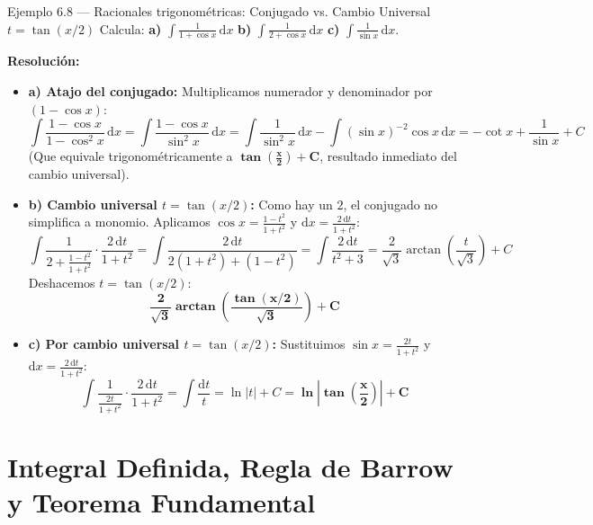 \documentclass[10pt,a4paper]{article}
\newcommand{\minspace}[1]{\par\ifdim\dimexpr\pagegoal-\pagetotal\relax<#1\newpage\fi}
\begin{document}
\begin{ejemploboxlong}{Ejemplo 6.8 --- Racionales trigonométricas: Conjugado vs. Cambio Universal $t = \tan(x/2)$}
Calcula: \quad \textbf{a)} $\displaystyle \int \frac{1}{1 + \cos x}\,\mathrm{d}x$ \qquad \textbf{b)} $\displaystyle \int \frac{1}{2 + \cos x}\,\mathrm{d}x$ \qquad \textbf{c)} $\displaystyle \int \frac{1}{\sin x}\,\mathrm{d}x$.
\par\textbf{Resolución:}
\begin{itemize}\itemsep 4pt
  \item \textbf{a) Atajo del conjugado:} Multiplicamos numerador y denominador por $(1 - \cos x)$:
  $$\int \frac{1 - \cos x}{1 - \cos^2 x}\,\mathrm{d}x = \int \frac{1 - \cos x}{\sin^2 x}\,\mathrm{d}x = \int \frac{1}{\sin^2 x}\,\mathrm{d}x - \int (\sin x)^{-2}\cos x\,\mathrm{d}x = -\cot x + \frac{1}{\sin x} + C$$
  (Que equivale trigonométricamente a $\displaystyle \mathbf{\tan\!\left(\frac{x}{2}\right) + C}$, resultado inmediato del cambio universal).

  \item \textbf{b) Cambio universal $t = \tan(x/2)$:} Como hay un $2$, el conjugado no simplifica a monomio. Aplicamos $\cos x = \frac{1-t^2}{1+t^2}$ y $\mathrm{d}x = \frac{2\,\mathrm{d}t}{1+t^2}$:
  $$\int \frac{1}{2 + \frac{1 - t^2}{1 + t^2}}\cdot\frac{2\,\mathrm{d}t}{1 + t^2} = \int \frac{2\,\mathrm{d}t}{2(1 + t^2) + (1 - t^2)} = \int \frac{2\,\mathrm{d}t}{t^2 + 3} = \frac{2}{\sqrt{3}}\arctan\!\left(\frac{t}{\sqrt{3}}\right) + C$$
  Deshacemos $t = \tan(x/2)$:
  $$\mathbf{\frac{2}{\sqrt{3}}\arctan\!\left(\frac{\tan(x/2)}{\sqrt{3}}\right) + C}$$

  \item \textbf{c) Por cambio universal $t = \tan(x/2)$:} Sustituimos $\sin x = \frac{2t}{1+t^2}$ y $\mathrm{d}x = \frac{2\,\mathrm{d}t}{1+t^2}$:
  $$\int \frac{1}{\frac{2t}{1+t^2}}\cdot\frac{2\,\mathrm{d}t}{1+t^2} = \int \frac{\mathrm{d}t}{t} = \ln|t| + C = \mathbf{\ln\!\left|\tan\!\left(\frac{x}{2}\right)\right| + C}$$
\end{itemize}
\end{ejemploboxlong}

\minspace{6.5cm}

\section{Integral Definida, Regla de Barrow y Teorema Fundamental}
\end{document}
